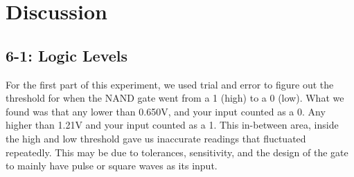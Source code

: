 \documentclass[%
 aip,
 jmp,
 amsmath,
 amssymb,
 reprint,%
 numerical,
 longbibliography,
]{revtex4-1}
\begin{document}
	
\section{Discussion} \label{Section:Discussion}

	\subsection{6-1: Logic Levels}
	
	For the first part of this experiment, we used trial and error to figure out the 
	threshold for when the NAND gate went from a 1 (high) to a 0 (low). What we found
	was that any lower than 0.650V, and your input counted as a 0. Any higher than 1.21V
	and your input counted as a 1. This in-between area, inside the high and low threshold
	gave us inaccurate readings that fluctuated repeatedly. This may be due to tolerances,
	sensitivity, and the design of the gate to mainly have pulse or square waves as its input.
	
\end{document}
